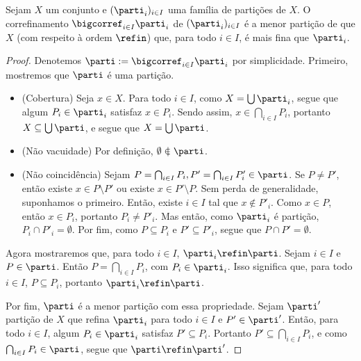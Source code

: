 \begin{proposition}
Sejam $X$ um conjunto e $(\parti_i)_{i \in I}$ uma família de partições de $X$. O correfinamento $\bigcorref_{i \in I} \parti_i$ de $(\parti_i)_{i \in I}$ é a menor partição de que $X$ (com respeito à ordem $\refin$) que, para todo $i \in I$, é mais fina que $\parti_i$.
\end{proposition}
\begin{proof}
Denotemos $\parti := \bigcorref_{i \in I} \parti_i$ por simplicidade. Primeiro, mostremos que $\parti$ é uma partição.
	\begin{itemize}
	\item (Cobertura) Seja $x \in X$. Para todo $i \in I$, como $X = \bigcup \parti_i$, segue que algum $P_i \in \parti_i$ satisfaz $x \in P_i$. Sendo assim, $x \in \bigcap_{i \in I} P_i$, portanto $X \subseteq \bigcup \parti$, e segue que $X = \bigcup \parti$.
	
	\item (Não vacuidade) Por definição, $\emptyset \notin \parti$.
	
	\item (Não coincidência) Sejam $P = \bigcap_{i \in I} P_i, P' = \bigcap_{i \in I} P'_i \in \parti$. Se $P \neq P'$, então existe $x \in P \setminus P'$ ou existe $x \in P' \setminus P$. Sem perda de generalidade, suponhamos o primeiro. Então, existe $i \in I$ tal que $x \notin P'_i$. Como $x \in P$, então $x \in P_i$, portanto $P_i \neq P'_i$. Mas então, como $\parti_i$ é partição, $P_i \cap P'_i = \emptyset$. Por fim, como $P \subseteq P_i$ e $P' \subseteq P'_i$, segue que $P \cap P' = \emptyset$.
	\end{itemize}  

Agora mostraremos que, para todo $i \in I$, $\parti_i \refin \parti$. Sejam $i \in I$ e $P \in \parti$. Então $P = \bigcap_{i \in I} P_i$, com $P_i \in \parti_i$. Isso significa que, para todo $i \in I$, $P \subseteq P_i$, portanto $\parti_i \refin \parti$.

Por fim, $\parti$ é a menor partição com essa propriedade. Sejam $\parti'$ partição de $X$ que refina $\parti_i$ para todo $i \in I$ e $P' \in \parti'$. Então, para todo $i \in I$, algum $P_i \in \parti_i$ satisfaz $P' \subseteq P_i$. Portanto $P' \subseteq \bigcap_{i \in I} P_i$, e como $\bigcap_{i \in I} P_i \in \parti$, segue que $\parti \refin \parti'$.
\end{proof}
